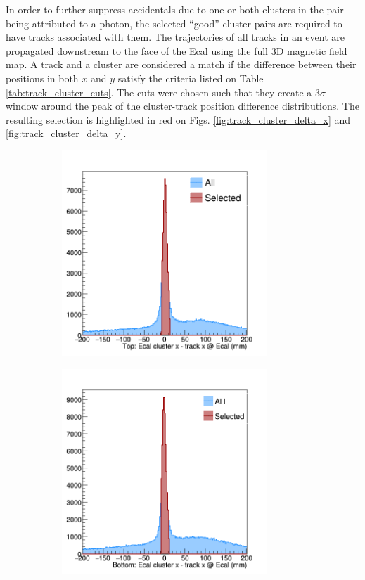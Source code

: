 In order to further suppress accidentals due to one or both clusters in the pair
being attributed to a photon, the 
selected ``good'' cluster pairs are required to have tracks associated 
with them. The trajectories of all tracks in an event are propagated downstream
to the face of the Ecal using the full 3D magnetic field map.  A track and a cluster
are considered a match if the difference between their positions in both $x$ 
and $y$ satisfy the criteria listed on Table \ref{tab:track_cluster_cuts}. The 
cuts were chosen such that they create a 3$\sigma$ window around the peak of 
the cluster-track position difference distributions. The resulting selection is 
highlighted in red on 
Figs. \ref{fig:track_cluster_delta_x} and \ref{fig:track_cluster_delta_y}.
\begin{figure}[h]
    \begin{subfigure}{.5\textwidth}
        \centering
        \includegraphics[width=0.85\textwidth]{images/20160502_pass4_cluster_track_delta_x_top.png}
    \end{subfigure}
    \begin{subfigure}{.5\textwidth}
        \centering
        \includegraphics[width=0.85\textwidth]{images/20160502_pass4_cluster_track_delta_x.png}

\end{subfigure}
\end{figure}
